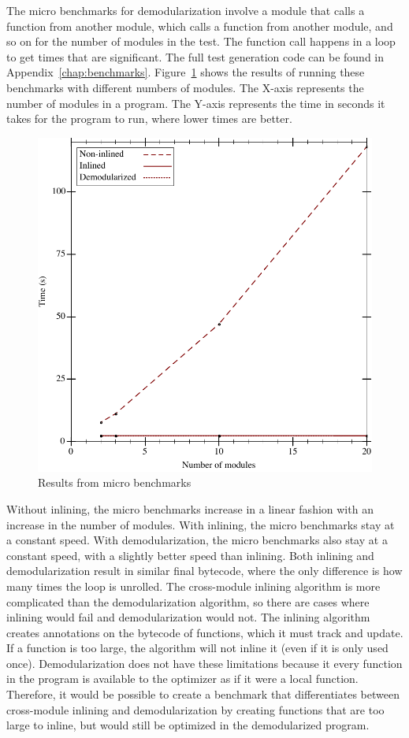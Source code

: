 The micro benchmarks for demodularization involve a module that calls a function from another module, which calls a function from another module, and so on for the number of modules in the test. 
The function call happens in a loop to get times that are significant.
The full test generation code can be found in Appendix~\ref{chap:benchmarks}.
Figure~\ref{fig:micro-results} shows the results of running these benchmarks with different numbers of modules.
The X-axis represents the number of modules in a program.
The Y-axis represents the time in seconds it takes for the program to run, where lower times are better.
\begin{figure}
\includegraphics{figures/micro-results}
\caption{Results from micro benchmarks}
\label{fig:micro-results}
\end{figure}
Without inlining, the micro benchmarks increase in a linear fashion with an increase in the number of modules.
With inlining, the micro benchmarks stay at a constant speed.
With demodularization, the micro benchmarks also stay at a constant speed, with a slightly better speed than inlining.
Both inlining and demodularization result in similar final bytecode, where the only difference is how many times the loop is unrolled.
The cross-module inlining algorithm is more complicated than the demodularization algorithm, so there are cases where inlining would fail and demodularization would not. 
The inlining algorithm creates annotations on the bytecode of functions, which it must track and update.
If a function is too large, the algorithm will not inline it (even if it is only used once). 
Demodularization does not have these limitations because it every function in the program is available to the optimizer as if it were a local function. 
Therefore, it would be possible to create a benchmark that differentiates between cross-module inlining and demodularization by creating functions that are too large to inline, but would still be optimized in the demodularized program.

